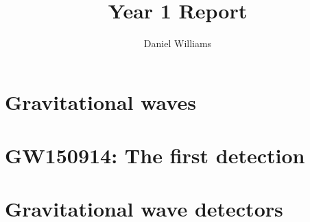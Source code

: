 \documentclass{kentigern}
\title{Year 1 Report}
\author{Daniel Williams}
\begin{document}
\maketitle

\newpage
%

\tableofcontents





\section{Gravitational waves}
\label{sec:gravwaves}



% 

\section{GW150914: The first detection}
\label{sec:gw150914:-first-dete}





\section{Gravitational wave detectors}
\label{sec:detectors}
\end{document}
